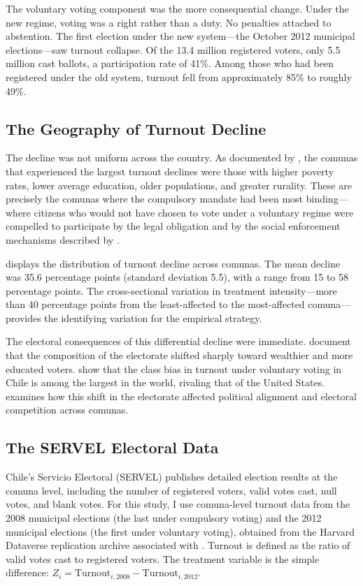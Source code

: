 \documentclass[12pt]{article}
\begin{document}
The voluntary voting component was the more consequential change. Under the new regime, voting was a right rather than a duty. No penalties attached to abstention. The first election under the new system---the October 2012 municipal elections---saw turnout collapse. Of the 13.4 million registered voters, only 5.5 million cast ballots, a participation rate of 41\%. Among those who had been registered under the old system, turnout fell from approximately 85\% to roughly 49\%.

\subsection{The Geography of Turnout Decline}

The decline was not uniform across the country. As documented by \citet{Cox2022}, the comunas that experienced the largest turnout declines were those with higher poverty rates, lower average education, older populations, and greater rurality. These are precisely the comunas where the compulsory mandate had been most binding---where citizens who would not have chosen to vote under a voluntary regime were compelled to participate by the legal obligation and by the social enforcement mechanisms described by \citet{Funk2010}.

 displays the distribution of turnout decline across comunas. The mean decline was 35.6 percentage points (standard deviation 5.5), with a range from 15 to 58 percentage points. The cross-sectional variation in treatment intensity---more than 40 percentage points from the least-affected to the most-affected comuna---provides the identifying variation for the empirical strategy.

The electoral consequences of this differential decline were immediate. \citet{Cox2025} document that the composition of the electorate shifted sharply toward wealthier and more educated voters. \citet{Contreras2016} show that the class bias in turnout under voluntary voting in Chile is among the largest in the world, rivaling that of the United States. \citet{Martinez2023} examines how this shift in the electorate affected political alignment and electoral competition across comunas.

\subsection{The SERVEL Electoral Data}

Chile's Servicio Electoral (SERVEL) publishes detailed election results at the comuna level, including the number of registered voters, valid votes cast, null votes, and blank votes. For this study, I use comuna-level turnout data from the 2008 municipal elections (the last under compulsory voting) and the 2012 municipal elections (the first under voluntary voting), obtained from the Harvard Dataverse replication archive associated with \citet{Cox2022}. Turnout is defined as the ratio of valid votes cast to registered voters. The treatment variable is the simple difference: $Z_i = \text{Turnout}_{i,2008} - \text{Turnout}_{i,2012}$.
\end{document}
